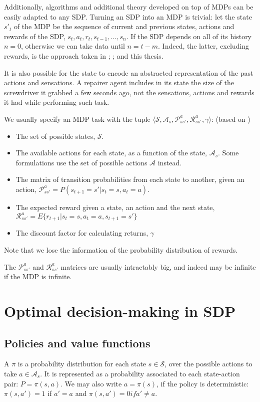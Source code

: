 Additionally, algorithms and additional theory developed on top of \acp{MDP} can
be easily adapted to any \ac{SDP}. Turning an \ac{SDP} into an \ac{MDP} is
trivial: let the state $s'_t$ of the \ac{MDP} be the sequence of current and
previous states, actions and rewards of the SDP, $s_t,a_t,r_t,s_{t-1},\dots,s_n$. If the
\ac{SDP} depends on all of its history $n=0$, otherwise we can take data until
$n=t-m$. Indeed, the latter, excluding rewards, is the approach taken in
\cite{mnih2015human}; \cite{kulkarni2016hierarchical}; and this thesis.

It is also possible for the state to encode an abstracted representation of the
past actions and sensations. A repairer agent includes in its state the size of
the screwdriver it grabbed a few seconds ago, not the sensations, actions and
rewards it had while performing such task.

We usually specify an \ac{MDP} task with the tuple $\langle \mathcal{S}, \mathcal{A}_s,
\mathcal{P}^a_{ss'}, \mathcal{R}^a_{ss'}, \gamma \rangle$:
(based on \cite[Section~3.6]{sutton1998introduction})
\begin{itemize}
\item The set of possible states, $\mathcal{S}$.
\item The available actions for each state, as a function of the state,
  $\mathcal{A}_s$. Some formulations use the set of possible actions
  $\mathcal{A}$ instead.
\item The matrix of transition probabilities from each state to another, given
  an action, $\mathcal{P}^a_{ss'} = P(s_{t+1}=s' | s_t=s, a_t=a)$.
\item The expected reward given a state, an action and the next state,
 $\mathcal{R}^a_{ss'} = E \lbrace r_{t+1} | s_t=s, a_t=a, s_{t+1}=s' \rbrace$
\item The discount factor for calculating returns, $\gamma$
\end{itemize}

Note that we lose the information of the probability distribution of rewards.

The $\mathcal{P}^a_{ss'}$ and $\mathcal{R}^a_{ss'}$ matrices are usually
intractably big, and indeed may be infinite if the \ac{MDP} is infinite.

\section{Optimal decision-making in SDP}
\subsection{Policies and value functions}
A  $\pi$ is a probability distribution for each state
$s\in\mathcal{S}$, over the possible actions to take $a \in \mathcal{A}_s$. It
is represented as a probability associated to each state-action pair: $P =
\pi(s, a)$. We may also write $a = \pi(s)$, if the policy is deterministic:
$\pi(s, a')=1$ if $a'=a$ and $\pi(s, a')=0 if  a' \neq a$.

